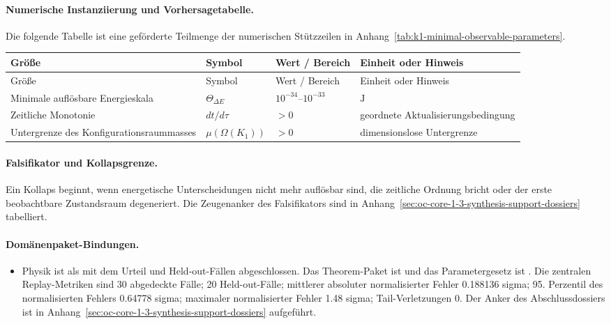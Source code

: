 \paragraph{Numerische Instanziierung und Vorhersagetabelle.}
Die folgende Tabelle ist eine geförderte Teilmenge der numerischen Stützzeilen in Anhang~\ref{tab:k1-minimal-observable-parameters}.
\begin{longtable}{@{}L{0.27\textwidth}L{0.15\textwidth}L{0.24\textwidth}L{0.16\textwidth}@{}}
\toprule
Größe & Symbol & Wert / Bereich & Einheit oder Hinweis \\
\midrule
\endfirsthead
\toprule
Größe & Symbol & Wert / Bereich & Einheit oder Hinweis \\
\midrule
\endhead
Minimale auflösbare Energieskala & $\scriptstyle \Theta_{\Delta E}$ & $10^{-34}\text{--}10^{-33}$ & $\mathrm{J}$ \\
Zeitliche Monotonie & $\scriptstyle dt/\allowbreak d\tau$ & $> 0$ & geordnete Aktualisierungsbedingung \\
Untergrenze des Konfigurationsraummasses & $\scriptstyle \mu(\Omega(K_1))$ & $> 0$ & dimensionslose Untergrenze \\
\bottomrule
\end{longtable}

\paragraph{Falsifikator und Kollapsgrenze.}
Ein Kollaps beginnt, wenn energetische Unterscheidungen nicht mehr auflösbar sind, die zeitliche Ordnung bricht oder der erste beobachtbare Zustandsraum degeneriert.
Die Zeugenanker des Falsifikators sind in Anhang~\ref{sec:oc-core-1-3-synthesis-support-dossiers} tabelliert.

\paragraph{Domänenpaket-Bindungen.}
\begin{itemize}[leftmargin=1.6em,nosep]
\item Physik ist als  mit dem Urteil  und  Held-out-Fällen abgeschlossen. Das Theorem-Paket ist  und das Parametergesetz ist . Die zentralen Replay-Metriken sind 30 abgedeckte Fälle; 20 Held-out-Fälle; mittlerer absoluter normalisierter Fehler 0.188136 sigma; 95. Perzentil des normalisierten Fehlers 0.64778 sigma; maximaler normalisierter Fehler 1.48 sigma; Tail-Verletzungen 0. Der Anker des Abschlussdossiers ist in Anhang~\ref{sec:oc-core-1-3-synthesis-support-dossiers} aufgeführt.
\end{itemize}

